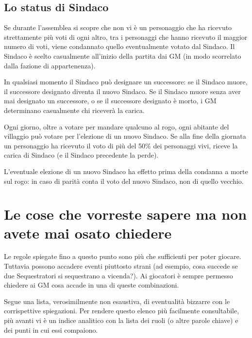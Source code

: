 \documentclass[a4paper,10pt]{article}
\begin{document}
\subsection{Lo status di Sindaco}
\label{sindaco}

Se durante l'assemblea si scopre che non vi è un personaggio che ha ricevuto
strettamente più voti di ogni altro, tra i personaggi che hanno ricevuto il
maggior numero di voti, viene condannato quello eventualmente votato dal
Sindaco.
Il Sindaco è scelto casualmente all'inizio della partita dai GM (in modo
scorrelato dalla fazione di appartenenza).

In qualsiasi momento il Sindaco può designare un successore: se il Sindaco
muore, il successore designato diventa il nuovo Sindaco. Se il Sindaco muore
senza aver mai designato un successore, o se il successore designato è morto, i
GM determinano casualmente chi riceverà la carica.

Ogni giorno, oltre a votare per mandare qualcuno al rogo, ogni abitante del
villaggio può votare per l'elezione di un nuovo Sindaco. Se alla fine della
giornata un personaggio ha ricevuto il voto di più del 50\% dei personaggi vivi,
riceve la carica di Sindaco (e il Sindaco precedente la perde).

L'eventuale elezione di un nuovo Sindaco ha effetto prima della condanna a morte
sul rogo: in caso di parità conta il voto del nuovo Sindaco, non di quello
vecchio.


\pagebreak
\section{Le cose che vorreste sapere ma non avete mai osato chiedere}
\label{faq}

Le regole spiegate fino a questo punto sono più che sufficienti per poter
giocare. Tuttavia possono accadere eventi piuttosto strani (ad esempio, cosa
succede se due Sequestratori si sequestrano a vicenda?). Ai giocatori è sempre permesso
chiedere ai GM cosa accade in una di queste combinazioni.

Segue una lista, verosimilmente non esaustiva, di eventualità bizzarre con le
corrispettive spiegazioni.
Per rendere questo elenco più facilmente consultabile, più avanti vi è un indice
analitico con la lista dei ruoli (o altre parole chiave) e dei punti in cui essi
compaiono.
\end{document}
